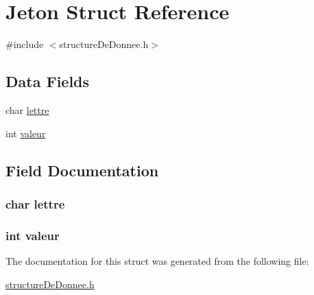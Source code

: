 \hypertarget{struct_jeton}{\section{Jeton Struct Reference}
\label{struct_jeton}
}


{\ttfamily \#include $<$structure\-De\-Donnee.\-h$>$}

\subsection*{Data Fields}
\begin{DoxyCompactItemize}
\item 
char \hyperlink{struct_jeton_a1fd1cee5d78e1f4af4a8fe512320ef95}{lettre}
\item 
int \hyperlink{struct_jeton_a8e030c012e3b74a6d076739c4c7ecb69}{valeur}
\end{DoxyCompactItemize}


\subsection{Field Documentation}
\hypertarget{struct_jeton_a1fd1cee5d78e1f4af4a8fe512320ef95}{
\subsubsection[{lettre}]{\setlength{\rightskip}{0pt plus 5cm}char lettre}}\label{struct_jeton_a1fd1cee5d78e1f4af4a8fe512320ef95}
\hypertarget{struct_jeton_a8e030c012e3b74a6d076739c4c7ecb69}{
\subsubsection[{valeur}]{\setlength{\rightskip}{0pt plus 5cm}int valeur}}\label{struct_jeton_a8e030c012e3b74a6d076739c4c7ecb69}


The documentation for this struct was generated from the following file\-:\begin{DoxyCompactItemize}
\item 
\hyperlink{structure_de_donnee_8h}{structure\-De\-Donnee.\-h}\end{DoxyCompactItemize}
